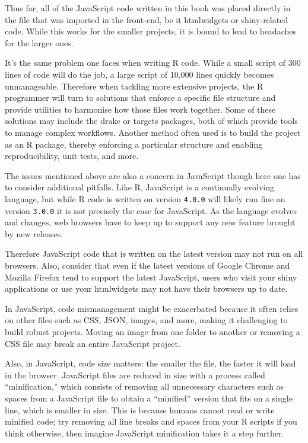 \documentclass[10pt,]{krantz}
\begin{document}
Thus far, all of the JavaScript code written in this book was placed directly in the file that was imported in the front-end, be it htmlwidgets or shiny-related code. While this works for the smaller projects, it is bound to lead to headaches for the larger ones.

It's the same problem one faces when writing R code. While a small script of 300 lines of code will do the job, a large script of 10,000 lines quickly becomes unmanageable. Therefore when tackling more extensive projects, the R programmer will turn to solutions that enforce a specific file structure and provide utilities to harmonise how those files work together. Some of these solutions may include the drake \citep{R-drake} or targets \citep{R-targets} packages, both of which provide tools to manage complex workflows. Another method often used is to build the project as an R package, thereby enforcing a particular structure and enabling reproducibility, unit tests, and more.

The issues mentioned above are also a concern in JavaScript though here one has to consider additional pitfalls. Like R, JavaScript is a continually evolving language, but while R code is written on version \texttt{4.0.0} will likely run fine on version \texttt{3.0.0} it is not precisely the case for JavaScript. As the language evolves and changes, web browsers have to keep up to support any new feature brought by new releases.

Therefore JavaScript code that is written on the latest version may not run on all browsers. Also, consider that even if the latest versions of Google Chrome and Mozilla Firefox tend to support the latest JavaScript, users who visit your shiny applications or use your htmlwidgets may not have their browsers up to date.

In JavaScript, code mismanagement might be exacerbated because it often relies on other files such as CSS, JSON, images, and more, making it challenging to build robust projects. Moving an image from one folder to another or removing a CSS file may break an entire JavaScript project.

Also, in JavaScript, code size matters: the smaller the file, the faster it will load in the browser. JavaScript files are reduced in size with a process called ``minification,'' which consists of removing all unnecessary characters such as spaces from a JavaScript file to obtain a ``minified'' version that fits on a single line, which is smaller in size. This is because humans cannot read or write minified code; try removing all line breaks and spaces from your R scripts if you think otherwise, then imagine JavaScript minification takes it a step further.
\end{document}
